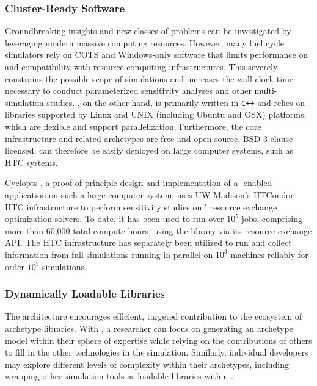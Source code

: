 \subsubsection{Cluster-Ready Software}

Groundbreaking insights and new classes of problems can be investigated by
leveraging modern massive computing resources.
However, many fuel cycle simulators rely on \gls{COTS} and Windows-only software that limits
performance on and compatibility with resource computing infrastructures. This
severely constrains the possible scope of simulations and increases the wall-clock time necessary to conduct parameterized sensitivity
analyses and other multi-simulation studies. \Cyclus, on the other hand, is
primarily written in \texttt{C++} and relies on
libraries supported by Linux and UNIX (including Ubuntu and OSX) platforms,
which are flexible and support parallelization.
Furthermore, the core infrastructure and related archetypes are free and
open source, BSD-3-clause licensed.  \Cyclus can therefore be easily deployed
on large computer systems, such as \gls{HTC} systems.

Cyclopts \cite{gidden_cyclopts_2015}, a proof of principle design and
implementation of a \Cyclus-enabled application on such a large computer system,
uses UW-Madison's HTCondor \gls{HTC} infrastructure to perform sensitivity
studies on \Cyclus' resource exchange optimization solvers. To date, it has been
used to run over $10^5$ jobs, comprising more than 60,000 total compute hours,
using the \Cyclus library via its resource exchange \gls{API}.  The \gls{HTC}
infrastructure has separately been utilized to run and collect information from
full \Cyclus simulations running in parallel on $10^3$ machines reliably for
order $10^5$ simulations.

\subsubsection{Dynamically Loadable Libraries}

The \Cyclus architecture encourages efficient, targeted contribution to the ecosystem of
archetype libraries.
With \Cyclus, a researcher can focus on generating an archetype model within their
sphere of expertise while relying on the contributions of others to fill
in the other technologies in the simulation.
Similarly, individual developers may explore different levels of complexity within their archetypes, including
wrapping other simulation tools as loadable libraries within \Cyclus.


